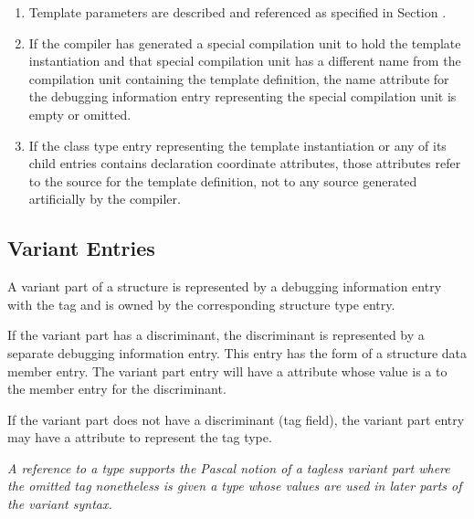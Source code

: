 \begin{enumerate}[1. ]
\item Template parameters are described and referenced as
specified in Section .

\item If the compiler has generated a special compilation unit to
hold the
template instantiation and that special compilation
unit has a different name from the compilation unit containing
the template definition, the name attribute for the debugging
information entry representing the special compilation unit
is empty or omitted.

\item If the class type entry representing the template
instantiation or any of its child entries contains declaration
coordinate attributes, those attributes refer to
the source for the template definition, not to any source
generated artificially by the compiler.
\end{enumerate}

\subsection{Variant Entries}
\label{chap:variantentries}

A variant part of a structure is represented by a debugging
information entry with the
tag \DWTAGvariantpartTARG{} and is
owned by the corresponding structure type entry.

If the variant part has a discriminant, the discriminant
is\hypertarget{chap:DWATdiscrdiscriminantofvariantpart}{}
represented by a 
separate debugging information entry.
\db
This entry has the form
of a 
structure data member entry. The variant part entry will
have a \DWATdiscrDEFN{} attribute 
whose value is a  to
the member entry for the discriminant.

If the variant part does not have a discriminant (tag field),
the variant part entry
\bb
may have
\eb
{}
a \DWATtype{} attribute to represent the tag type.

\bb
\textit{A reference to a type supports the Pascal notion of a
tagless variant part where the omitted tag nonetheless is given
a type whose values are used in later parts of the variant syntax.}
\eb


